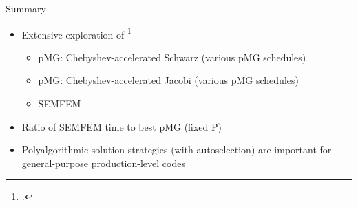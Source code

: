 \begin{frame}{Summary}
  \begin{itemize}
    \item Extensive exploration of \footcite{phillips-tuning-2022}
    \begin{itemize}
      \item pMG: Chebyshev-accelerated Schwarz (various pMG schedules)
      \item pMG: Chebyshev-accelerated Jacobi (various pMG schedules)
      \item SEMFEM
    \end{itemize}
    \item Ratio of SEMFEM time to best pMG (fixed P)
    \item Polyalgorithmic solution strategies (with autoselection)
        are important for general-purpose production-level codes
  \end{itemize}
\end{frame}